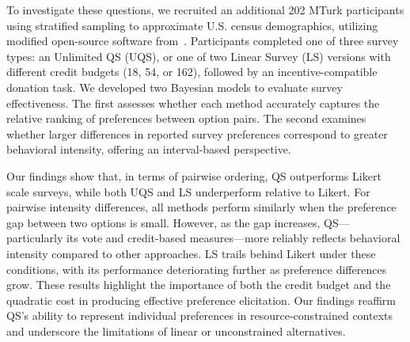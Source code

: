 
To investigate these questions, we recruited an additional 202 MTurk participants using stratified sampling to approximate U.S. census demographics, utilizing modified open-source software from~\citet{chengCanShowWhat2021}. Participants completed one of three survey types: an Unlimited QS (UQS), or one of two Linear Survey (LS) versions with different credit budgets (18, 54, or 162), followed by an incentive-compatible donation task. We developed two Bayesian models to evaluate survey effectiveness. The first assesses whether each method accurately captures the relative ranking of preferences between option pairs. The second examines whether larger differences in reported survey preferences correspond to greater behavioral intensity, offering an interval-based perspective.

Our findings show that, in terms of pairwise ordering, QS outperforms Likert scale surveys, while both UQS and LS underperform relative to Likert. For pairwise intensity differences, all methods perform similarly when the preference gap between two options is small. However, as the gap increases, QS—particularly its vote and credit-based measures—more reliably reflects behavioral intensity compared to other approaches. LS trails behind Likert under these conditions, with its performance deteriorating further as preference differences grow. These results highlight the importance of both the credit budget and the quadratic cost in producing effective preference elicitation. Our findings reaffirm QS’s ability to represent individual preferences in resource-constrained contexts and underscore the limitations of linear or unconstrained alternatives.


